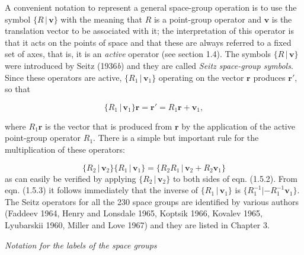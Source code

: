 \documentclass[11pt,a4paper,twoside,openright]{book}
\begin{document}
A convenient notation to represent a general space-group operation is to use the symbol $\{R \,|\, \mathbf{v}\}$ with the meaning that $R$ is a point-group operator and $\mathbf{v}$ is the translation vector to be associated with it; the interpretation of this operator is that it acts on the points of space and that these are always referred to a fixed set of axes, that is, it is an \textit{active} operator (see section 1.4). The symbols $\{R \,|\, \mathbf{v}\}$ were introduced by Seitz (1936\textit{b}) and they are called \textit{Seitz space-group symbols}. Since these operators are active, $\{R_{1} \,|\, \mathbf{v}_{1}\}$ operating on the vector $\mathbf{r}$ produces $\mathbf{r}'$, so that

\begin{equation*}
\{R_{1} \,|\, \mathbf{v}_{1}\}\mathbf{r} = \mathbf{r}' = R_{1}\mathbf{r} + \mathbf{v}_{1}, \tag{1.5.2}
\end{equation*}

where $R_{1}\mathbf{r}$ is the vector that is produced from $\mathbf{r}$ by the application of the active point-group operator $R_{1}$. There is a simple but important rule for the multiplication of these operators:

\begin{equation*}
\{R_{2} \,|\, \mathbf{v}_{2}\}\{R_{1} \,|\, \mathbf{v}_{1}\} = \{R_{2}R_{1} \,|\, \mathbf{v}_{2} + R_{2}\mathbf{v}_{1}\} \tag{1.5.3}
\end{equation*}
 as can easily be verified by applying $\{R_{2} \,|\, \mathbf{v}_{2}\}$ to both sides of eqn. (1.5.2). From eqn. (1.5.3) it follows immediately that the inverse of $\{R_{1} \,|\, \mathbf{v}_{1}\}$ is $\{R_{1}^{-1} | -R_{1}^{-1}\mathbf{v}_{1}\}$. The Seitz operators for all the 230 space groups are identified by various authors (Faddeev 1964, Henry and Lonsdale 1965, Koptsik 1966, Kovalev 1965, Lyubarskii 1960, Miller and Love 1967) and they are listed in Chapter 3.

\textit{Notation for the labels of the space groups}
\end{document}
